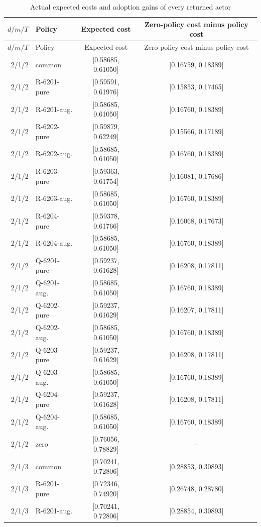 {\small\setlength{\tabcolsep}{3pt}
\begin{longtable}{rlcc}
\caption{Actual expected costs and adoption gains of every returned actor}\label{tab:all-costs62} \\
\hline
$d/m/T$ & Policy & Expected cost & Zero-policy cost minus policy cost \\
\hline\endfirsthead
\hline
$d/m/T$ & Policy & Expected cost & Zero-policy cost minus policy cost \\
\hline\endhead
2/1/2 & common & [0.58685, 0.61050] & [0.16759, 0.18389] \\
2/1/2 & R-6201-pure & [0.59591, 0.61976] & [0.15853, 0.17465] \\
2/1/2 & R-6201-aug. & [0.58685, 0.61050] & [0.16760, 0.18389] \\
2/1/2 & R-6202-pure & [0.59879, 0.62249] & [0.15566, 0.17189] \\
2/1/2 & R-6202-aug. & [0.58685, 0.61050] & [0.16760, 0.18389] \\
2/1/2 & R-6203-pure & [0.59363, 0.61754] & [0.16081, 0.17686] \\
2/1/2 & R-6203-aug. & [0.58685, 0.61050] & [0.16760, 0.18389] \\
2/1/2 & R-6204-pure & [0.59378, 0.61766] & [0.16068, 0.17673] \\
2/1/2 & R-6204-aug. & [0.58685, 0.61050] & [0.16760, 0.18389] \\
2/1/2 & Q-6201-pure & [0.59237, 0.61628] & [0.16208, 0.17811] \\
2/1/2 & Q-6201-aug. & [0.58685, 0.61050] & [0.16760, 0.18389] \\
2/1/2 & Q-6202-pure & [0.59237, 0.61629] & [0.16207, 0.17811] \\
2/1/2 & Q-6202-aug. & [0.58685, 0.61050] & [0.16760, 0.18389] \\
2/1/2 & Q-6203-pure & [0.59237, 0.61629] & [0.16208, 0.17811] \\
2/1/2 & Q-6203-aug. & [0.58685, 0.61050] & [0.16760, 0.18389] \\
2/1/2 & Q-6204-pure & [0.59237, 0.61628] & [0.16208, 0.17811] \\
2/1/2 & Q-6204-aug. & [0.58685, 0.61050] & [0.16760, 0.18389] \\
2/1/2 & zero & [0.76056, 0.78829] & -- \\
2/1/3 & common & [0.70241, 0.72806] & [0.28853, 0.30893] \\
2/1/3 & R-6201-pure & [0.72346, 0.74920] & [0.26748, 0.28780] \\
2/1/3 & R-6201-aug. & [0.70241, 0.72806] & [0.28854, 0.30893] \\

\end{longtable}}
